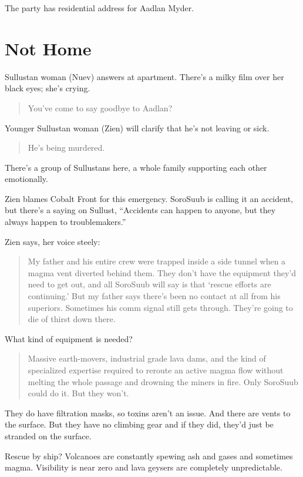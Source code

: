 \documentclass{book}
\begin{document}
The party has residential address for Aadlan Myder.

\chapter{Not Home}

Sullustan woman (Nuev) answers at apartment. There’s a milky film over her black eyes; she’s crying.
\begin{quote}
You’ve come to say goodbye to Aadlan? 
\end{quote}

Younger Sullustan woman (Zien) will clarify that he’s not leaving or sick.
\begin{quote}
He’s being murdered.
\end{quote}

There’s a group of Sullustans here, a whole family supporting each other emotionally.

Zien blames Cobalt Front for this emergency. SoroSuub is calling it an accident, but there’s a saying on Sullust, “Accidents can happen to anyone, but they always happen to troublemakers.”

Zien says, her voice steely:
\begin{quote}
My father and his entire crew were trapped inside a side tunnel when a magma vent diverted behind them. They don’t have the equipment they’d need to get out, and all SoroSuub will say is that ‘rescue efforts are continuing.’ But my father says there’s been no contact at all from his superiors. Sometimes his comm signal still gets through. They’re going to die of thirst down there.
\end{quote}


What kind of equipment is needed? \\
\begin{quote}
Massive earth-movers, industrial grade lava dams, and the kind of specialized expertise required to reroute an active magma flow without melting the whole passage and drowning the miners in fire. Only SoroSuub could do it. But they won’t.
\end{quote}

They do have filtration masks, so toxins aren’t an issue. And there are vents to the surface. But they have no climbing gear and if they did, they’d just be stranded on the surface.


Rescue by ship? Volcanoes are constantly spewing ash and gases and sometimes magma. Visibility is near zero and lava geysers are completely unpredictable. 
\end{document}
